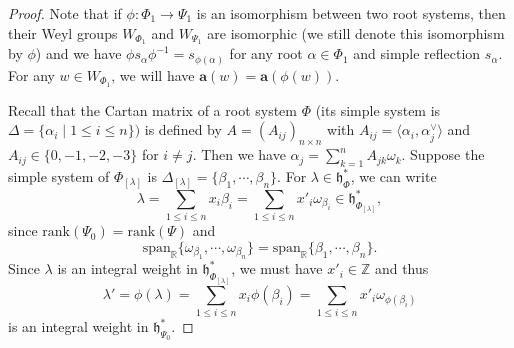 \documentclass[reqno,12pt]{amsart}
\numberwithin{equation}{section}
\theoremstyle{plain}
\theoremstyle{definition}
\newcommand{\lam}{\lambda}
\newcommand{\aff}{ \mathbf{a} }
\newcommand{\lest}{\leqslant}
\begin{document}
\begin{proof}
Note that if $\phi: \Phi_1 \rightarrow \Psi_1$  is an isomorphism between two root systems, then their Weyl groups $W_{\Phi_1}$  and $W_{\Psi_1}$ are isomorphic (we still denote this isomorphism by $\phi$) and we have $\phi s_{\alpha}\phi ^{-1}=s_{\phi(\alpha)}$ for any root $\alpha \in \Phi_1$  and simple reflection $s_{\alpha}$. For any $w\in W_{\Phi_1}$, we will have 
$\aff(w)=\aff(\phi(w))$. 

Recall that the Cartan matrix of a root system $\Phi$ (its simple system is $\Delta=\{\alpha_i \mid  1\lest i\lest n\})$ is defined by
$A=(A_{ij})_{n\times n}$ with $A_{ij}={\langle \alpha_i, \alpha_j^\vee \rangle}$ and $A_{ij}\in \{0,-1,-2,-3\}$ for $i \neq j$. Then we have $\alpha_j=\sum\limits_{k=1}^n A_{jk}\omega_k$. 
Suppose the simple system of $\Phi_{[\lam]}$ is $\Delta_{[\lam]}=\{\beta_1,\cdots,\beta_n\}$. For $\lam \in \mathfrak{h}_{\Phi}^*$, we can write $$\lam=\sum_{1\lest i\lest n}x_i\beta_i=\sum_{1\lest i\lest n}x'_i\omega_{\beta_i}\in \mathfrak{h}_{\Phi_{[\lam]}}^*,$$ since $\mathrm{rank} {(\Psi_0)}=\mathrm{rank} {(\Psi)}$ and $$\mathrm{span}_{\mathbb{R}}\{\omega_{\beta_1},\cdots,\omega_{\beta_n}\}=\mathrm{span}_{\mathbb{R}}\{\beta_1,\cdots,\beta_n\}.$$
Since $\lam$ is an integral weight in $\mathfrak{h}_{\Phi_{[\lam]}}^*$, we must have $x'_i\in \mathbb{Z}$ and thus
$$\lam'=\phi(\lam)=\sum_{1\lest i\lest n}x_i\phi(\beta_i)=\sum_{1\lest i\lest n}x'_i\omega_{\phi({\beta_i})}$$ is an integral weight in $\mathfrak{h}_{\Psi_{0}}^*$.












\end{proof}
\end{document}
